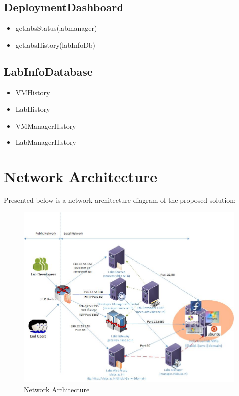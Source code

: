 \documentclass[11pt]{article}
\begin{document}
\subsection{DeploymentDashboard}
\label{sec-4.4}


\begin{itemize}
\item getlabsStatus(labmanager)
\item getlabsHistory(labInfoDb)
\end{itemize}
\subsection{LabInfoDatabase}
\label{sec-4.5}


\begin{itemize}
\item VMHistory
\item LabHistory
\item VMManagerHistory
\item LabManagerHistory
\end{itemize}
\section{Network Architecture}
\label{sec-5}

  Presented below is a network architecture diagram of the proposed
  solution:

   \begin{figure}[H]
\centering
\includegraphics[width=16cm]{network-infrastructure.jpg}
\caption{Network Architecture}
\end{figure} 
\end{document}
